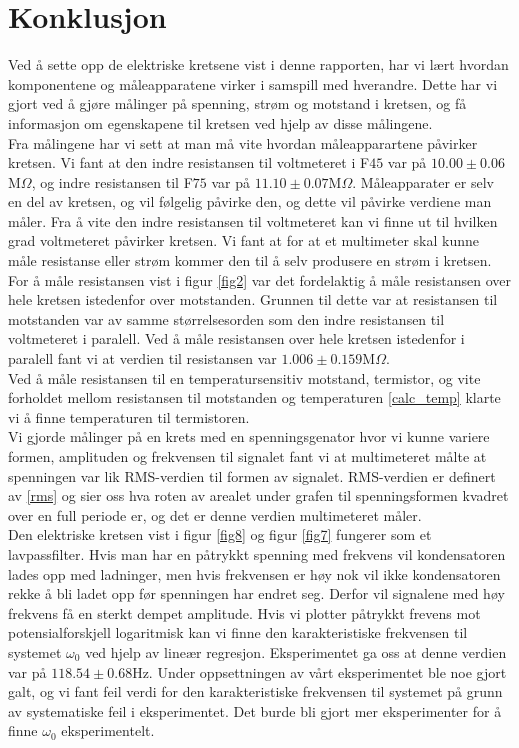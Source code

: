 \documentclass[%
 reprint,
 amsmath,amssymb,
 aps,
]{revtex4-1}
\begin{document}
\section{Konklusjon}
Ved å sette opp de elektriske kretsene vist i denne rapporten, har vi lært hvordan komponentene og måleapparatene virker i samspill med hverandre. Dette har vi gjort ved å gjøre målinger på spenning, strøm og motstand i kretsen, og få informasjon om egenskapene til kretsen ved hjelp av disse målingene. \\
Fra målingene har vi sett at man må vite hvordan måleapparartene påvirker kretsen. Vi fant at den indre resistansen til voltmeteret i F$45$ var på $10.00 \pm 0.06$M$\Omega$, og indre resistansen til F$75$ var på $11.10 \pm 0.07$M$\Omega$. Måleapparater er selv en del av kretsen, og vil følgelig påvirke den, og dette vil påvirke verdiene man måler. Fra å vite den indre resistansen til voltmeteret kan vi finne ut til hvilken grad voltmeteret påvirker kretsen. Vi fant at for at et multimeter skal kunne måle resistanse eller strøm kommer den til å selv produsere en strøm i kretsen. \\For å måle resistansen vist i figur \ref{fig2} var det fordelaktig å måle resistansen over hele kretsen istedenfor over motstanden. Grunnen til dette var at resistansen til motstanden var av samme størrelsesorden som den indre resistansen til voltmeteret i paralell. Ved å måle resistansen over hele kretsen istedenfor i paralell fant vi at verdien til resistansen var $1.006\pm0.159$M$\Omega$. \\
Ved å måle resistansen til en temperatursensitiv motstand, termistor, og vite forholdet mellom resistansen til motstanden og temperaturen \eqref{calc_temp} klarte vi å finne temperaturen til termistoren. \\
Vi gjorde målinger på en krets med en spenningsgenator hvor vi kunne variere formen, amplituden og frekvensen til signalet fant vi at multimeteret målte at spenningen var lik RMS-verdien til formen av signalet. RMS-verdien er definert av \eqref{rms} og sier oss hva roten av arealet under grafen til spenningsformen kvadret over en full periode er, og det er denne verdien multimeteret måler. \\
Den elektriske kretsen vist i figur \ref{fig8} og figur \ref{fig7} fungerer som et lavpassfilter. Hvis man har en påtrykkt spenning med frekvens vil kondensatoren lades opp med ladninger, men hvis frekvensen er høy nok vil ikke kondensatoren rekke å bli ladet opp før spenningen har endret seg. Derfor vil signalene med høy frekvens få en sterkt dempet amplitude. Hvis vi plotter påtrykkt frevens mot potensialforskjell logaritmisk kan vi finne den karakteristiske frekvensen til systemet $\omega_0$ ved hjelp av lineær regresjon. Eksperimentet ga oss at denne verdien var på $118.54 \pm 0.68$Hz. Under oppsettningen av vårt eksperimentet ble noe gjort galt, og vi fant feil verdi for den karakteristiske frekvensen til systemet på grunn av systematiske feil i eksperimentet. Det burde bli gjort mer eksperimenter for å finne $\omega_0$ eksperimentelt.
\end{document}
